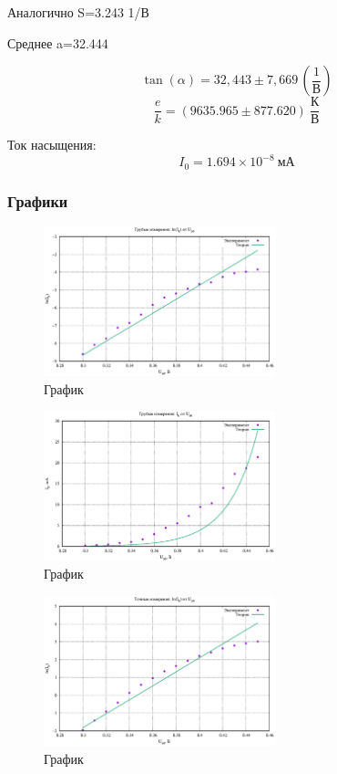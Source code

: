Аналогично S=3.243 1/В

Среднее a=32.444

\[
\tan(\alpha) = 32,443 \pm 7,669 \, \left(\frac{1}{\text{В}}\right)
\]
\[
\frac{e}{k} = (9635.965 \pm 877.620)~\frac{\text{К}}{\text{В}}
\]

Ток насыщения:
\[
I_0 = 1.694 \times 10^{-8}~\text{мА}
\]


\subsubsection{Графики}


\begin{figure}[H]
\centering
\includegraphics[width=0.6\textwidth]{plot1_3.eps}
\caption{График}
\label{fig:device}
\end{figure}


\begin{figure}[H]
\centering
\includegraphics[width=0.6\textwidth]{plot2_3.eps}
\caption{График}
\label{fig:device}
\end{figure}


\begin{figure}[H]
\centering
\includegraphics[width=0.6\textwidth]{plot3_3.eps}
\caption{График}
\label{fig:device}
\end{figure}


